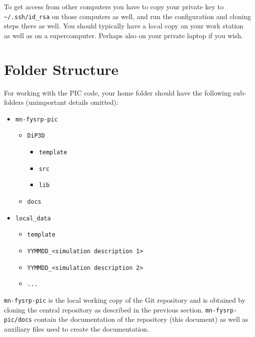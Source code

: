 \documentclass[10pt,a4paper]{article}
\begin{document}
To get access from other computers you have to copy your private key to \lstinline$~/.ssh/id_rsa$ on those computers as well, and run the configuration and cloning steps there as well. You should typically have a local copy on your work station as well as on a supercomputer. Perhaps also on your private laptop if you wish.

\section{Folder Structure}
For working with the PIC code, your home folder should have the following sub-folders (unimportant details omitted):

\begin{itemize}
	\item \lstinline$mn-fysrp-pic$
	\begin{itemize}
		\item \lstinline$DiP3D$
		\begin{itemize}
			\item \lstinline$template$
			\item \lstinline$src$
			\item \lstinline$lib$
		\end{itemize}
		\item \lstinline$docs$
	\end{itemize}
	\item \lstinline$local_data$
	\begin{itemize}
		\item \lstinline$template$
		\item \lstinline$YYMMDD_<simulation description 1>$
		\item \lstinline$YYMMDD_<simulation description 2>$
		\item \lstinline$...$
	\end{itemize}
\end{itemize}

\lstinline$mn-fysrp-pic$ is the local working copy of the Git repository and is obtained by cloning the central repository as described in the previous section. \lstinline$mn-fysrp-pic/docs$ contain the documentation of the repository (this document) as well as auxiliary files used to create the documentation.
\end{document}
